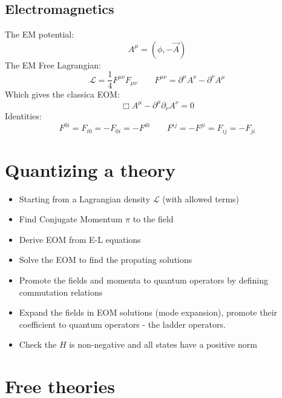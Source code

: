 \documentclass{article}
\begin{document}
\subsection{Electromagnetics}
The EM potential:
\begin{equation*}
    A^\mu = (\phi, -\vec{A})
\end{equation*}
The EM Free Lagrangian:
\begin{equation*}
    \mathcal{L} = \frac{1}{4}F^{\mu\nu}F_{\mu\nu}
    \qquad
    F^{\mu\nu} = \partial^\mu A^\nu - \partial^\nu A^\mu
\end{equation*}
Which gives the classica EOM:
\begin{equation*}
    \Box A^\mu - \partial^\mu \partial_\nu A^\nu = 0
\end{equation*}
Identities:
\begin{equation*}
    F^{0i} = F_{i0} = -F_{0i} = -F^{i0}
    \qquad
    F^{ij} = -F^{ji} = F_{ij} = -F_{ji}
\end{equation*}

\section{Quantizing a theory}
\begin{itemize}
    \item Starting from a Lagrangian density $\mathcal{L}$ (with allowed terms)
    \item Find Conjugate Momentum $\pi$ to the field
    \item Derive EOM from E-L equations
    \item Solve the EOM to find the propating solutions
    \item Promote the fields and momenta to quantum operators by defining commutation relations
    \item Expand the fields in EOM solutions (mode expansion), promote their coefficient to quantum operators - the ladder operators.
    \item Check the $H$ is non-negative and all states have a positive norm
\end{itemize}
\section{Free theories}
\end{document}
